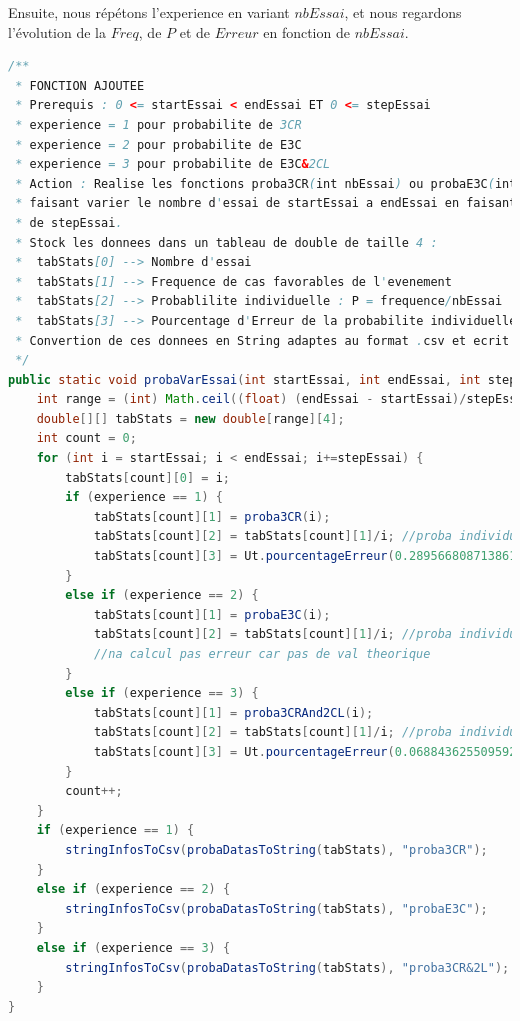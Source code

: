\documentclass{report}
\begin{document}
\noindent Ensuite, nous répétons l'experience en variant $nbEssai$, et nous regardons l'évolution de la $Freq$, de $P$ et de $Erreur$ en fonction de $nbEssai$.
\newpage
\begin{lstlisting}[language=java, caption={\it Fonction pour réaliser les expériences en variant nbEssai avec l'événement à choisir en paramètre}, label=codeProba]
/**
 * FONCTION AJOUTEE
 * Prerequis : 0 <= startEssai < endEssai ET 0 <= stepEssai 
 * experience = 1 pour probabilite de 3CR
 * experience = 2 pour probabilite de E3C
 * experience = 3 pour probabilite de E3C&2CL
 * Action : Realise les fonctions proba3CR(int nbEssai) ou probaE3C(int nb) en 
 * faisant varier le nombre d'essai de startEssai a endEssai en faisant des pas
 * de stepEssai.
 * Stock les donnees dans un tableau de double de taille 4 :
 *  tabStats[0] --> Nombre d'essai
 *  tabStats[1] --> Frequence de cas favorables de l'evenement
 *  tabStats[2] --> Probablilite individuelle : P = frequence/nbEssai
 *  tabStats[3] --> Pourcentage d'Erreur de la probabilite individuelle de l'evenement par rapport a la valeur theorique ; calculable seulement en connaissance de la valeur theorique
 * Convertion de ces donnees en String adaptes au format .csv et ecrit le String dans un fichier : "proba3CR.csv" ou "probaE3C.csv" ou "proba3CR&2L"
 */
public static void probaVarEssai(int startEssai, int endEssai, int stepEssai, int experience) throws FileNotFoundException {
    int range = (int) Math.ceil((float) (endEssai - startEssai)/stepEssai);
    double[][] tabStats = new double[range][4];
    int count = 0;
    for (int i = startEssai; i < endEssai; i+=stepEssai) {
        tabStats[count][0] = i;
        if (experience == 1) {
            tabStats[count][1] = proba3CR(i);
            tabStats[count][2] = tabStats[count][1]/i; //proba individuelle
            tabStats[count][3] = Ut.pourcentageErreur(0.28956680871386137, tabStats[count][2]); 
        }
        else if (experience == 2) {
            tabStats[count][1] = probaE3C(i);
            tabStats[count][2] = tabStats[count][1]/i; //proba individuelle
            //na calcul pas erreur car pas de val theorique
        }
        else if (experience == 3) {
            tabStats[count][1] = proba3CRAnd2CL(i);
            tabStats[count][2] = tabStats[count][1]/i; //proba individuelle
            tabStats[count][3] = Ut.pourcentageErreur(0.06884362550959248, tabStats[count][2]); 
        }
        count++;
    }
    if (experience == 1) {
        stringInfosToCsv(probaDatasToString(tabStats), "proba3CR"); 
    }
    else if (experience == 2) {
        stringInfosToCsv(probaDatasToString(tabStats), "probaE3C");
    }
    else if (experience == 3) {
        stringInfosToCsv(probaDatasToString(tabStats), "proba3CR&2L");
    }
}
\end{lstlisting}
\end{document}
